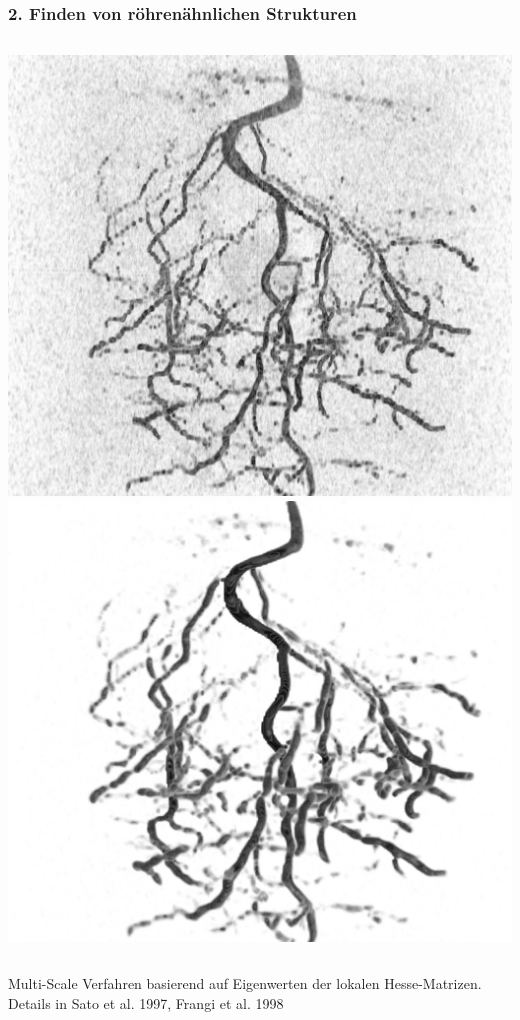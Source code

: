 \documentclass[final,ngerman,ignorenonframetext,compress]{beamer}
\begin{document}
\begin{frame}
	\frametitle{2. Finden von r\"ohren\"ahnlichen Strukturen}
	\begin{columns}
		\includegraphics[width=\linewidth]{img2/raw-4.png}
		\includegraphics[width=\linewidth]{img2/sato-bone-4.png}
	\end{columns}
	\begin{center}	
		Multi-Scale Verfahren basierend auf Eigenwerten der lokalen Hesse-Matrizen.
		Details in Sato et al. 1997, Frangi et al. 1998
	\end{center}
\end{frame}
\end{document}
